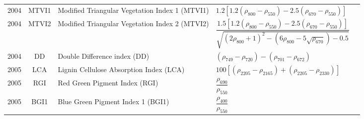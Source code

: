 \documentclass[10pt]{article}
\begin{document}
\begin{ThreePartTable}
\begin{longtable}{c c m{2.80in} M{2.80in} M{1.5in}}
  2004 & MTVI1   & Modified Triangular Vegetation Index 1 (MTVI1)                                 & $1.2[1.2(\rho_{800}-\rho_{550})-2.5(\rho_{670}-\rho_{550})]$                                                                                                                                                                                                                            & \citet{Haboudane2004}                               \\
  2004 & MTVI2   & Modified Triangular Vegetation Index 2 (MTVI2)                                 & $\dfrac{1.5[1.2(\rho_{800}-\rho_{550})-2.5(\rho_{670}-\rho_{550})]}{\sqrt{(2\rho_{800}+1)^2-(6\rho_{800}-5\sqrt{\rho_{670}})-0.5}}$                                                                                                                                                     & \citet{Haboudane2004}                               \\
  2004 & DD      & Double Difference index (DD)                                                   & $(\rho_{749}-\rho_{720})-(\rho_{701}-\rho_{672})$                                                                                                                                                                                                                                       & \citet{LeMaire2004}                                 \\
  2005 & LCA     & Lignin Cellulose Absorption Index (LCA)                                        & $100[(\rho_{2205} - \rho_{2165}) + (\rho_{2205} - \rho_{2330})]$                                                                                                                                                                                                                        & \citet{Daughtry2005}                                \\
  2005 & RGI     & Red Green Pigment Index (RGI)                                                  & $\dfrac{\rho_{690}}{\rho_{550}}$                                                                                                                                                                                                                                                        & \citet{Zarco-Tejada2005}                            \\
  2005 & BGI1    & Blue Green Pigment Index 1 (BGI1)                                              & $\dfrac{\rho_{400}}{\rho_{550}}$                                                                                                                                                                                                                                                        & \citet{Zarco-Tejada2005}                            \\

\end{longtable}
\end{ThreePartTable}
\end{document}
